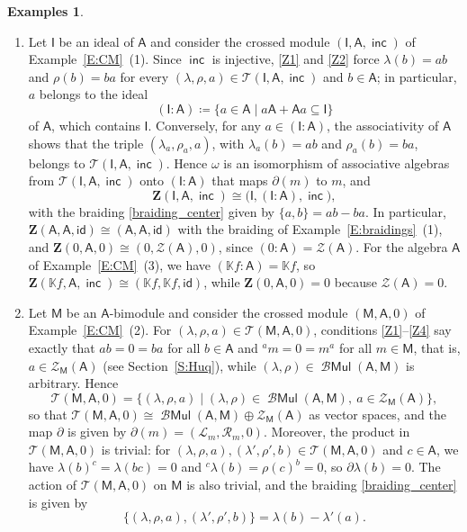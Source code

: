 \documentclass[12pt,reqno]{amsart}
\theoremstyle{plain}
\theoremstyle{definition}
\newtheorem{examples}[theorem]{Examples}
\theoremstyle{remark}
\def\lam{\lambda}
\newcommand{\K}{\ensuremath{\mathbb{K}}}
\newcommand{\A}{\ensuremath{\mathsf{A}}}
\newcommand{\id}{\ensuremath{\mathsf{id}}}
\newcommand{\MM}{\ensuremath{\mathsf{M}}}
\newcommand{\II}{\ensuremath{\mathsf{I}}}
\newcommand{\ZZ}{\ensuremath{\mathscr{Z}}}
\newcommand{\ZC}{\ensuremath{\mathbf{Z}}}
\newcommand{\T}{\ensuremath{\mathcal{T}}}
\newcommand{\LL}{\ensuremath{\mathcal{L}}}
\newcommand{\RR}{\ensuremath{\mathcal{R}}}
\DeclareMathOperator{\Mul}{\mathcal{B}\ensuremath{\mathsf{Mul}}}
\DeclareMathOperator{\inc}{\ensuremath{\mathsf{inc}}}
\numberwithin{equation}{section}
\begin{document}
\begin{examples}\label{E:centers} \hfill
	\begin{enumerate}
		\item Let $\II$ be an ideal of $\A$ and consider the crossed module $(\II,\A,\inc)$ of Example~\ref{E:CM}~(1). Since $\inc$ is injective, \eqref{Z1} and \eqref{Z2} force $\lam(b)=ab$ and $\rho(b)=ba$ for every $(\lam,\rho,a)\in\T(\II,\A,\inc)$ and $b\in\A$; in particular, $a$ belongs to the ideal
		\[
		(\II:\A)\coloneqq\{a\in\A \mid a\A+\A a\subseteq\II\}
		\]
		of $\A$, which contains $\II$. Conversely, for any $a\in(\II:\A)$, the associativity of $\A$ shows that the triple $(\lam_a,\rho_a,a)$, with $\lam_a(b)=ab$ and $\rho_a(b)=ba$, belongs to $\T(\II,\A,\inc)$. Hence $\omega$ is an isomorphism of associative algebras from $\T(\II,\A,\inc)$ onto $(\II:\A)$ that maps $\partial(m)$ to $m$, and
		\[
		\ZC(\II,\A,\inc)\cong\bigl(\II,(\II:\A),\inc\bigr),
		\]
		with the braiding \eqref{braiding_center} given by $\{a,b\}=ab-ba$. In particular, $\ZC(\A,\A,\id)\cong(\A,\A,\id)$ with the braiding of Example~\ref{E:braidings}~(1), and $\ZC(0,\A,0)\cong(0,\ZZ(\A),0)$, since $(0:\A)=\ZZ(\A)$. For the algebra $\A$ of Example~\ref{E:CM}~(3), we have $(\K f:\A)=\K f$, so $\ZC(\K f,\A,\inc)\cong(\K f,\K f,\id)$, while $\ZC(0,\A,0)=0$ because $\ZZ(\A)=0$.

		\item Let $\MM$ be an $\A$-bimodule and consider the crossed module $(\MM,\A,0)$ of Example~\ref{E:CM}~(2). For $(\lam,\rho,a)\in\T(\MM,\A,0)$, conditions \eqref{Z1}--\eqref{Z4} say exactly that $ab=0=ba$ for all $b\in\A$ and ${}^am=0=m^a$ for all $m\in\MM$, that is, $a\in\ZZ_{\MM}(\A)$ (see Section~\ref{S:Huq}), while $(\lam,\rho)\in\Mul(\A,\MM)$ is arbitrary. Hence
		\[
		\T(\MM,\A,0)=\{(\lam,\rho,a)\mid (\lam,\rho)\in\Mul(\A,\MM),\ a\in\ZZ_{\MM}(\A)\},
		\]
		so that $\T(\MM,\A,0)\cong\Mul(\A,\MM)\oplus\ZZ_{\MM}(\A)$ as vector spaces, and the map $\partial$ is given by $\partial(m)=(\LL_m,\RR_m,0)$. Moreover, the product in $\T(\MM,\A,0)$ is trivial: for $(\lam,\rho,a),(\lam',\rho',b)\in\T(\MM,\A,0)$ and $c\in\A$, we have $\lam(b)^c=\lam(bc)=0$ and ${}^c\lam(b)=\rho(c)^b=0$, so $\partial\lam(b)=0$. The action of $\T(\MM,\A,0)$ on $\MM$ is also trivial, and the braiding \eqref{braiding_center} is given by
		\[
		\{(\lam,\rho,a),(\lam',\rho',b)\}=\lam(b)-\lam'(a).
		\]


\end{enumerate}
\end{examples}
\end{document}
